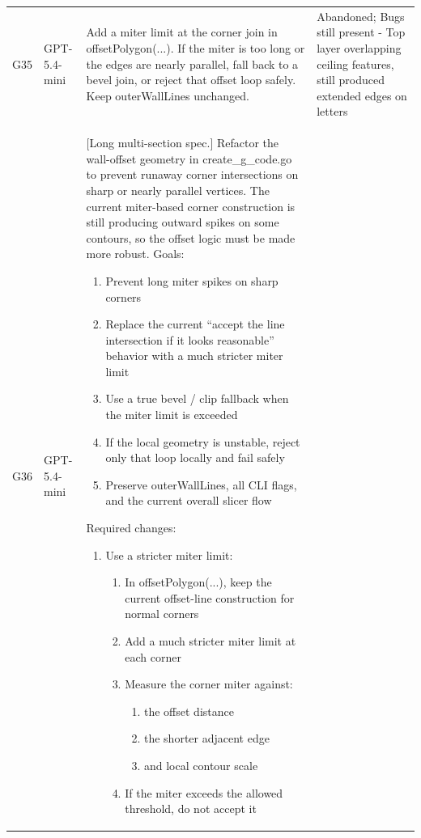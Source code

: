 \documentclass[10pt,twocolumn,a4paper]{article}
\begin{document}
\begin{longtable}{@{}p{0.6cm}p{1.5cm}p{11.0cm}p{2.7cm}@{}}
\addlinespace
G35 & GPT-5.4-mini & Add a miter limit at the corner join in offsetPolygon(...). If the miter is too long or the edges are nearly parallel, fall back to a bevel join, or reject that offset loop safely. Keep outerWallLines unchanged. & Abandoned; Bugs still present - Top layer overlapping ceiling features, still produced extended edges on letters \\
\addlinespace
G36 & GPT-5.4-mini & [Long multi-section spec.] \newline
Refactor the wall-offset geometry in create\_g\_code.go to prevent runaway corner intersections on sharp or nearly parallel vertices. The current miter-based corner construction is still producing outward spikes on some contours, so the offset logic must be made more robust. \newline
Goals:
\begin{enumerate}
	\item{Prevent long miter spikes on sharp corners}
	\item{Replace the current “accept the line intersection if it looks reasonable” behavior with a much stricter miter limit}
	\item{Use a true bevel / clip fallback when the miter limit is exceeded}
	\item{If the local geometry is unstable, reject only that loop locally and fail safely}
	\item{Preserve outerWallLines, all CLI flags, and the current overall slicer flow}
\end{enumerate}
Required changes:
\begin{enumerate}
	\item{Use a stricter miter limit:}
	\begin{enumerate}
		\item{In offsetPolygon(...), keep the current offset-line construction for normal corners}
		\item{Add a much stricter miter limit at each corner}
		\item{Measure the corner miter against:}
		\begin{enumerate}
			\item{the offset distance}
			\item{the shorter adjacent edge}
			\item{and local contour scale} 
		\end{enumerate}
		\item{If the miter exceeds the allowed threshold, do not accept it} 
	\end{enumerate} 

\end{enumerate}
\end{longtable}
\end{document}
